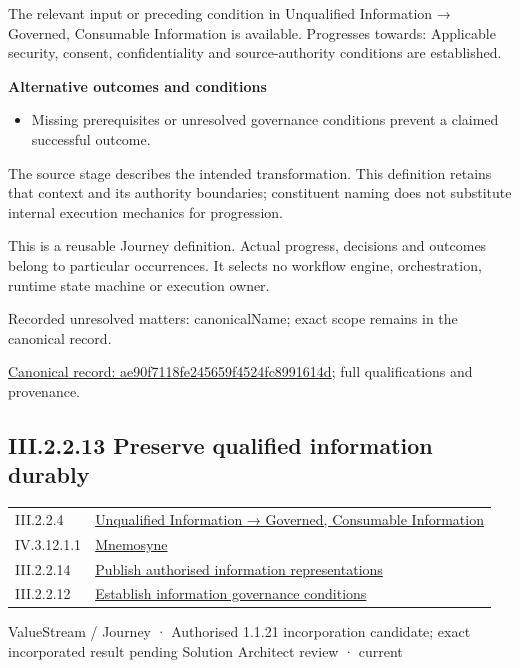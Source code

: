 The relevant input or preceding condition in Unqualified Information → Governed, Consumable Information is available. Progresses towards: Applicable security, consent, confidentiality and source-authority conditions are established.



\par\medskip\textbf{Alternative outcomes and conditions}\par


\begin{itemize}


\item Missing prerequisites or unresolved governance conditions prevent a claimed successful outcome.

\end{itemize}


The source stage describes the intended transformation. This definition retains that context and its authority boundaries; constituent naming does not substitute internal execution mechanics for progression.



This is a reusable Journey definition. Actual progress, decisions and outcomes belong to particular occurrences. It selects no workflow engine, orchestration, runtime state machine or execution owner.


{\small Recorded unresolved matters: canonicalName; exact scope remains in the canonical record.}\par
{\footnotesize \href{../../../../continuum/strategy/value-stream/ae90f7118fe245659f4524fc8991614d.md}{Canonical record: ae90f7118fe245659f4524fc8991614d}; full qualifications and provenance.}\par
\subsection*{III.2.2.13 Preserve qualified information durably}
\label{navigation:III.2.2.13}

\begin{longtable}{p{.22\linewidth}p{.73\linewidth}}
III.2.2.4 & \hyperref[element:02e036f18bab400bac261007e39457ee]{Unqualified Information → Governed, Consumable Information} \\
IV.3.12.1.1 & \hyperref[element:7985e647bf9e4ca3ba70faf9e3e4ae02]{Mnemosyne} \\
III.2.2.14 & \hyperref[element:91da459e860e4f359e440a65f0c94bcb]{Publish authorised information representations} \\
III.2.2.12 & \hyperref[element:ae90f7118fe245659f4524fc8991614d]{Establish information governance conditions} \\
\end{longtable}
\label{element:e07ef0bcd9444af3a22ab45bbb3afc38}
{\small ValueStream / Journey · Authorised 1.1.21 incorporation candidate; exact incorporated result pending Solution Architect review · current}\par

